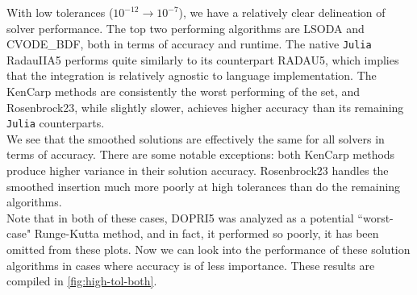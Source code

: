 \documentclass[review,onefignum,onetabnum]{siamart171218}
\begin{document}
With low tolerances ($10^{-12} \rightarrow 10^{-7}$), we have a relatively clear
delineation of solver performance. The top two performing algorithms are LSODA and
CVODE\_BDF, both in terms of accuracy and runtime. The native \texttt{Julia} RadauIIA5
performs quite similarly to its counterpart RADAU5, which implies that the integration
is relatively agnostic to language implementation. The KenCarp methods are consistently
the worst performing of the set, and Rosenbrock23, while slightly slower, achieves higher
accuracy than its remaining \texttt{Julia} counterparts.\\

We see that the smoothed solutions are effectively
the same for all solvers in terms of accuracy. There are some notable exceptions:
both KenCarp methods produce higher variance in their solution accuracy. Rosenbrock23
handles the smoothed insertion much more poorly at high tolerances than do the remaining
algorithms. \\

Note that in both of these cases, DOPRI5 was analyzed as a potential ``worst-case"
Runge-Kutta method, and in fact, it performed so poorly, it has been omitted from these
plots. Now we can look into the performance of these solution algorithms in cases where
accuracy is of less importance. These results are compiled in \cref{fig:high-tol-both}.\\
\end{document}
